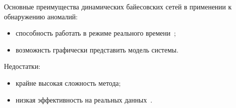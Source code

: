 Основные преимущества динамических байесовских сетей в применении к обнаружению аномалий:
\begin{itemize}
	\item способность работать в режиме реального времени~\cite{DBNAnomalyDetection};
	\item возможнсть графически представить модель системы.
\end{itemize}

Недостатки:
\begin{itemize}
	\item крайне высокая сложность метода;
	\item низкая эффективность на реальных данных~\cite{MartinCompUnsupervisedDetectionMethods}.
\end{itemize}